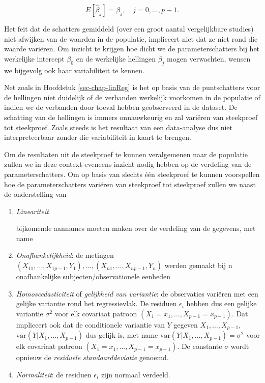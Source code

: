 \documentclass[
  dutch,
  letterpaper,
  12pt]{book}
\theoremstyle{definition}
\theoremstyle{definition}
\theoremstyle{definition}
\theoremstyle{remark}
\begin{document}
\[E[\hat \beta_j]=\beta_j,\quad j=0,\ldots,p-1.\]

Het feit dat de schatters gemiddeld (over een groot aantal vergelijkbare
studies) niet afwijken van de waarden in de populatie, impliceert niet
dat ze niet rond die waarde variëren. Om inzicht te krijgen hoe dicht we
de parameterschatters bij het werkelijke intercept \(\beta_0\) en de
werkelijke hellingen \(\beta_j\) mogen verwachten, wensen we bijgevolg
ook haar variabiliteit te kennen.

Net zoals in Hoofdstuk \ref{sec-chap-linReg} is het op basis van de
puntschatters voor de hellingen niet duidelijk of de verbanden werkelijk
voorkomen in de populatie of indien we de verbanden door toeval hebben
geobserveerd in de dataset. De schatting van de hellingen is immers
onnauwkeurig en zal variëren van steekproef tot steekproef. Zoals steeds
is het resultaat van een data-analyse dus niet interpreteerbaar zonder
die variabiliteit in kaart te brengen.

Om de resultaten uit de steekproef te kunnen veralgemenen naar de
populatie zullen we in deze context eveneens inzicht nodig hebben op de
verdeling van de parameterschatters. Om op basis van slechts één
steekproef te kunnen voorspellen hoe de parameterschatters variëren van
steekproef tot steekproef zullen we naast de onderstelling van

\begin{enumerate}
\def\labelenumi{\arabic{enumi}.}
\item
  \emph{Lineariteit}

  bijkomende aannames moeten maken over de verdeling van de gegevens,
  met name
\item
  \emph{Onafhankelijkheid}: de metingen
  \((X_{11},\dots, X_{1p-1}, Y_1), ...,  (X_{n1},\ldots,X_{np-1},Y_n)\)
  werden gemaakt bij n onafhankelijke subjecten/observationele eenheden
\item
  \emph{Homoscedasticiteit} of \emph{gelijkheid van variantie}: de
  observaties variëren met een gelijke variantie rond het regressievlak.
  De residuen \(\epsilon_i\) hebben dus een gelijke variantie
  \(\sigma^2\) voor elk covariaat patroon
  \((X_1=x_1, ..., X_{p-1}=x_{p-1})\). Dat impliceert ook dat de
  conditionele variantie van \(Y\) gegeven \(X_1,\ldots,X_{p-1}\),
  \(\text{var}(Y\vert X_1,\ldots,X_{p-1})\) dus gelijk is, met name
  \(\text{var}(Y\vert  X_1,\ldots,X_{p-1}) = \sigma^2\) voor elk
  covariaat patroon \((X_1=x_1, ..., X_{p-1}=x_{p-1})\). De constante
  \(\sigma\) wordt opnieuw de \emph{residuele standaarddeviatie}
  genoemd.
\item
  \emph{Normaliteit}: de residuen \(\epsilon_i\) zijn normaal verdeeld.
\end{enumerate}
\end{document}
